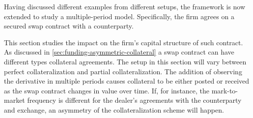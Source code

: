 \documentclass[main.tex]{subfiles}
\begin{document}
    Having discussed different examples from different setups,
    the framework is now extended to study a multiple-period model.
    Specifically, the firm agrees on a secured swap contract with a counterparty.
    
    This section studies the impact on the firm's capital structure of such contract.
    As discussed in \cref{sec:funding-asymmetric-collateral} a swap contract can have different types collateral agreements.
    The setup in this section will vary between perfect collateralization and partial collateralization.
    The addition of observing the derivative in multiple periods causes collateral to be either posted or received as the swap contract changes in value over time.
    If, for instance, the mark-to-market frequency is different for the dealer's agreements with the counterparty and exchange, an asymmetry of the collateralization scheme will happen.

\end{document}
